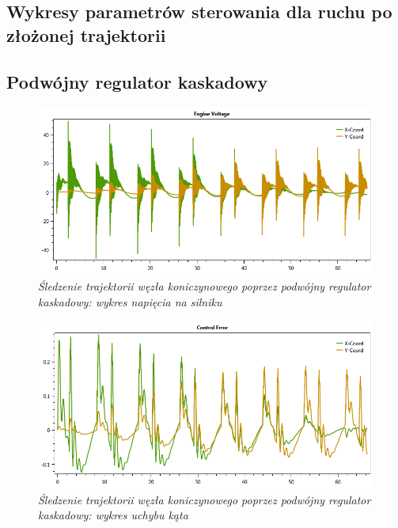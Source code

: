 \documentclass[12pt, oneside]{report}
\theoremstyle{definition}
\begin{document}
\appendix
\begin{appendices}
  \chapter{Wykresy parametrów sterowania dla ruchu po złożonej trajektorii}
\label{appenix:A}
  
\section{Podwójny regulator kaskadowy}
\begin{figure}[H]
	\centering
		\includegraphics[width = 400pt]{TrefoilKnotCascadeEV} 
		\caption{\textit{Śledzenie trajektorii węzła koniczynowego poprzez podwójny regulator kaskadowy: wykres napięcia na silniku}}
		\label{plot:TrefoilKnotCascadeEV}
\end{figure}

\begin{figure}[H]
	\centering
		\includegraphics[width = 400pt]{TrefoilKnotCascadeCE} 
		\caption{\textit{Śledzenie trajektorii węzła koniczynowego poprzez podwójny regulator kaskadowy: wykres uchybu kąta}}
		\label{plot:TrefoilKnotCascadeCE}
\end{figure}


\end{appendices}
\end{document}
